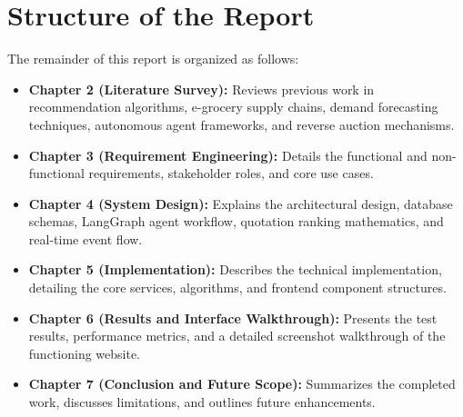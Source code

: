 \section{Structure of the Report}

The remainder of this report is organized as follows:
\begin{itemize}
    \item \textbf{Chapter 2 (Literature Survey):} Reviews previous work in recommendation algorithms, e-grocery supply chains, demand forecasting techniques, autonomous agent frameworks, and reverse auction mechanisms.
    \item \textbf{Chapter 3 (Requirement Engineering):} Details the functional and non-functional requirements, stakeholder roles, and core use cases.
    \item \textbf{Chapter 4 (System Design):} Explains the architectural design, database schemas, LangGraph agent workflow, quotation ranking mathematics, and real-time event flow.
    \item \textbf{Chapter 5 (Implementation):} Describes the technical implementation, detailing the core services, algorithms, and frontend component structures.
    \item \textbf{Chapter 6 (Results and Interface Walkthrough):} Presents the test results, performance metrics, and a detailed screenshot walkthrough of the functioning website.
    \item \textbf{Chapter 7 (Conclusion and Future Scope):} Summarizes the completed work, discusses limitations, and outlines future enhancements.
\end{itemize}
